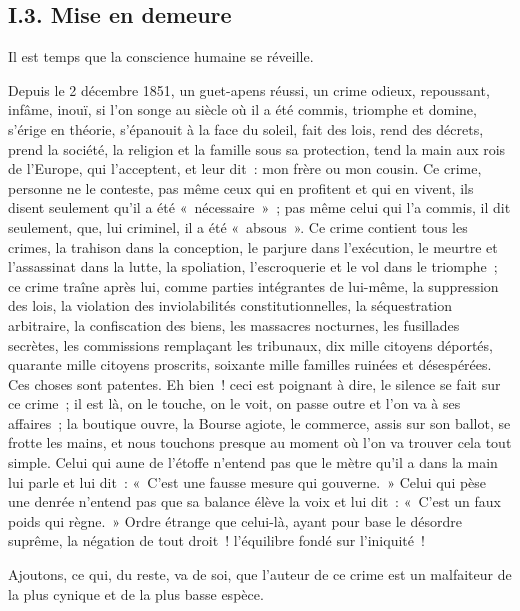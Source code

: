 \documentclass[french,twoside]{book} %
\begin{document}
\subsection[{I.3. Mise en demeure}]{I.3. Mise en demeure}
\noindent Il est temps que la conscience humaine se réveille.\par
Depuis le 2 décembre 1851, un guet-apens réussi, un crime odieux, repoussant, infâme, inouï, si l’on songe au siècle où il a été commis, triomphe et domine, s’érige en théorie, s’épanouit à la face du soleil, fait des lois, rend des décrets, prend la société, la religion et la famille sous sa protection, tend la main aux rois de l’Europe, qui l’acceptent, et leur dit : mon frère ou mon cousin. Ce crime, personne ne le conteste, pas même ceux qui en profitent et qui en vivent, ils disent seulement qu’il a été « nécessaire » ; pas même celui qui l’a commis, il dit seulement, que, lui criminel, il a été « absous ». Ce crime contient tous les crimes, la trahison dans la conception, le parjure dans l’exécution, le meurtre et l’assassinat dans la lutte, la spoliation, l’escroquerie et le vol dans le triomphe ; ce crime traîne après lui, comme parties intégrantes de lui-même, la suppression des lois, la violation des inviolabilités constitutionnelles, la séquestration arbitraire, la confiscation des biens, les massacres nocturnes, les fusillades secrètes, les commissions remplaçant les tribunaux, dix mille citoyens déportés, quarante mille citoyens proscrits, soixante mille familles ruinées et désespérées. Ces choses sont patentes. Eh bien ! ceci est poignant à dire, le silence se fait sur ce crime ; il est là, on le touche, on le voit, on passe outre et l’on va à ses affaires ; la boutique ouvre, la Bourse agiote, le commerce, assis sur son ballot, se frotte les mains, et nous touchons presque au moment où l’on va trouver cela tout simple. Celui qui aune de l’étoffe n’entend pas que le mètre qu’il a dans la main lui parle et lui dit : « C’est une fausse mesure qui gouverne. » Celui qui pèse une denrée n’entend pas que sa balance élève la voix et lui dit : « C’est un faux poids qui règne. » Ordre étrange que celui-là, ayant pour base le désordre suprême, la négation de tout droit ! l’équilibre fondé sur l’iniquité !\par
Ajoutons, ce qui, du reste, va de soi, que l’auteur de ce crime est un malfaiteur de la plus cynique et de la plus basse espèce.\par
\end{document}
